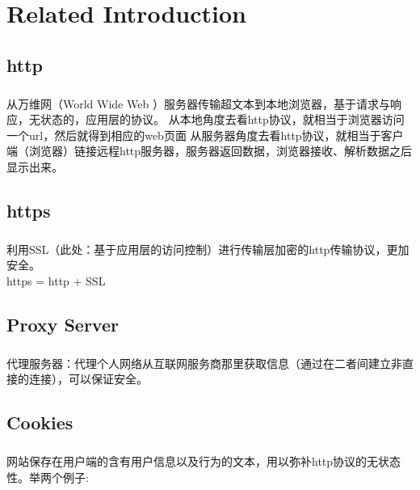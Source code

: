 \documentclass{article}
\begin{document}
	\section{Related Introduction}

	\subsection{http}
	\subparagraph{}
	\begin{CJK}{UTF8}{gbsn}
		从万维网（World Wide Web ）服务器传输超文本到本地浏览器，基于请求与响应，无状态的，应用层的协议。
从本地角度去看http协议，就相当于浏览器访问一个url，然后就得到相应的web页面
从服务器角度去看http协议，就相当于客户端（浏览器）链接远程http服务器，服务器返回数据，浏览器接收、解析数据之后显示出来。 
	\end{CJK}{}
	\subsection{https}
	\subparagraph{}
	\begin{CJK}{UTF8}{gbsn}
		利用SSL（此处：基于应用层的访问控制）进行传输层加密的http传输协议，更加安全。\\ 
		https = http + SSL
	\end{CJK}{}
	\subsection{Proxy Server}
	\subparagraph{}
	\begin{CJK}{UTF8}{gbsn}
		代理服务器：代理个人网络从互联网服务商那里获取信息（通过在二者间建立非直接的连接），可以保证安全。
	\end{CJK}{}
	\subsection{Cookies}
	\subparagraph{}
	\begin{CJK}{UTF8}{gbsn}
		网站保存在用户端的含有用户信息以及行为的文本，用以弥补http协议的无状态性。举两个例子:
	\end{CJK}{}
\end{document}
